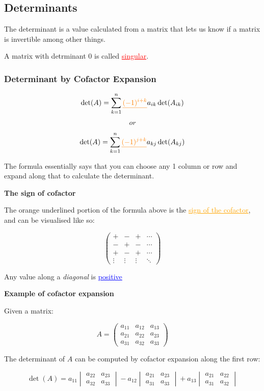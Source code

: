 \documentclass{article}
\newcommand{\bul}[1]{\textcolor{blue}{\underline{#1}}}
\newcommand{\rul}[1]{\textcolor{red}{\underline{#1}}}
\newcommand{\sub}[1]{\vspace{10pt}\textbf{#1}}
\newcommand{\ssbreak}{\vspace{5pt}}
\begin{document}
\subsection{Determinants}
The determinant is a value calculated from a matrix that lets us know if a matrix is invertible among other things.

\ssbreak


A matrix with detrminant 0 is called \rul{singular}.

\subsubsection{Determinant by Cofactor Expansion}
\[
\det(A) = \sum_{k=1}^{n} \textcolor{orange}{\underline{(-1)^{i+k}}} a_{ik} \det(A_{ik})
\]

\[
or
\]

\[
\det(A) = \sum_{k=1}^{n} \textcolor{orange}{\underline{(-1)^{j+k}}} a_{kj} \det(A_{kj})
\]

The formula essentially says that you can choose any 1 column or row and expand along that to calculate the determinant.

\sub{The sign of cofactor}

The orange underlined portion of the formula above is the \textcolor{orange}{\underline{sign of the cofactor}}, and can be visualised like so:

\[
\begin{pmatrix}
+ & - & + & \cdots \\
- & + & - & \cdots \\
+ & - & + & \cdots \\
\vdots & \vdots & \vdots & \ddots
\end{pmatrix}
\]

Any value along a \textit{diagonal} is \bul{positive}

\sub{Example of cofactor expansion}

Given a matrix:

\[
A = \begin{pmatrix}
a_{11} & a_{12} & a_{13} \\
a_{21} & a_{22} & a_{23} \\
a_{31} & a_{32} & a_{33}
\end{pmatrix}
\]

The determinant of \( A \) can be computed by cofactor expansion along the first row:

\[
\det(A) = a_{11} \begin{vmatrix} a_{22} & a_{23} \\ a_{32} & a_{33} \end{vmatrix}
- a_{12} \begin{vmatrix} a_{21} & a_{23} \\ a_{31} & a_{33} \end{vmatrix}
+ a_{13} \begin{vmatrix} a_{21} & a_{22} \\ a_{31} & a_{32} \end{vmatrix}
\]
\end{document}
